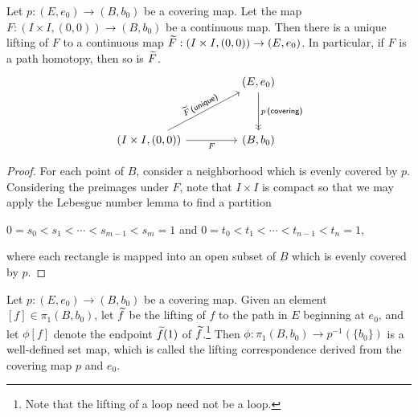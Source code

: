\begin{thm}
    Let $p: (E, e_0)\rightarrow (B, b_0)$ be a covering map.
    Let the map $F: (I\times I, (0, 0))\rightarrow (B, b_0)$ be a continuous map.
    Then there is a unique lifting of $F$ to a continuous map $\widetilde{F}: (I\times I, (0, 0))\rightarrow (E, e_0)$.
    In particular, if $F$ is a path homotopy, then so is $\widetilde{F}$.
    \begin{equation*}
    \begin{tikzcd}[row sep=1.2cm, column sep=1.6cm]
        &
        (E, e_0)
        \arrow[d, "p\,\textsf{(covering)}", ->>]
        \\
        (I\times I, (0, 0))
        \arrow[ur, "\wt{F}\,\textsf{(unique)}"sloped]
        \arrow[r, "F"']
        &
        (B, b_0)
    \end{tikzcd}
    \end{equation*}
\end{thm}
\begin{proof}
    For each point of $B$, consider a neighborhood which is evenly covered by $p$.
    Considering the preimages under $F$, note that $I\times I$ is compact so that we may apply the Lebesgue number lemma to find a partition
    \begin{center}
        $0=s_0<s_1<\cdots<s_{m-1}<s_m=1$ and $0=t_0<t_1<\cdots<t_{n-1}<t_n=1$,
    \end{center}
    where each rectangle is mapped into an open subset of $B$ which is evenly covered by $p$.
\end{proof}

\begin{defi}
    Let $p: (E, e_0)\rightarrow (B, b_0)$ be a covering map.
    Given an element $[f]\in\pi_1(B, b_0)$, let $\widetilde{f}$ be the lifting of $f$ to the path in $E$ beginning at $e_0$, and let $\phi[f]$ denote the endpoint $\widetilde{f}(1)$ of $\widetilde{f}$.\footnote{Note that the lifting of a loop need not be a loop.}
    Then $\phi: \pi_1(B, b_0)\rightarrow p^{-1}(\{b_0\})$ is a well-defined set map, which is called the lifting correspondence derived from the covering map $p$ and $e_0$.
\end{defi}

